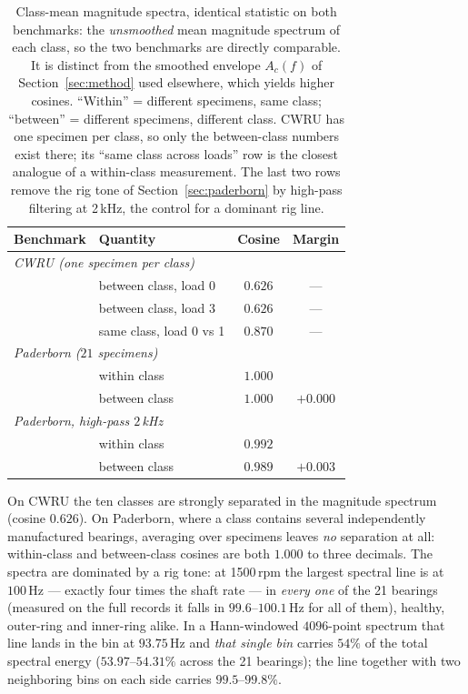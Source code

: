\documentclass[preprint,12pt]{elsarticle}
\begin{document}
\begin{table}[t]
\centering
\caption{Class-mean magnitude spectra, identical statistic on both benchmarks:
the \emph{unsmoothed} mean magnitude spectrum of each class, so the two
benchmarks are directly comparable. It is distinct from the smoothed envelope
$A_c(f)$ of Section~\ref{sec:method} used elsewhere, which yields higher
cosines.
``Within'' = different specimens, same class; ``between'' = different
specimens, different class. CWRU has one specimen per class, so only the
between-class numbers exist there; its ``same class across loads'' row is the
closest analogue of a within-class measurement. The last two rows remove the
rig tone of Section~\ref{sec:paderborn} by high-pass filtering at 2\,kHz, the
control for a dominant rig line.}
\label{tab:bench}
\small
\begin{tabular}{llcc}
\toprule
Benchmark & Quantity & Cosine & Margin \\
\midrule
\multicolumn{4}{l}{\emph{CWRU (one specimen per class)}} \\
 & between class, load 0   & $0.626$ & --- \\
 & between class, load 3   & $0.626$ & --- \\
 & same class, load 0 vs 1 & $0.870$ & --- \\
\midrule
\multicolumn{4}{l}{\emph{Paderborn ($21$ specimens)}} \\
 & within class            & $1.000$ & \\
 & between class           & $1.000$ & $+0.000$ \\
\midrule
\multicolumn{4}{l}{\emph{Paderborn, high-pass $2$\,kHz}} \\
 & within class            & $0.992$ & \\
 & between class           & $0.989$ & $+0.003$ \\
\bottomrule
\end{tabular}
\end{table}

On CWRU the ten classes are strongly separated in the magnitude spectrum
(cosine $0.626$). On Paderborn, where a class contains several independently
manufactured bearings, averaging over specimens leaves \emph{no} separation at
all: within-class and between-class cosines are both $1.000$ to three decimals.
The spectra are dominated by a rig tone: at 1500\,rpm the largest spectral line
is at $100$\,Hz --- exactly four times the shaft rate --- in \emph{every one} of
the 21 bearings (measured on the full records it falls in $99.6$--$100.1$\,Hz
for all of them), healthy, outer-ring and inner-ring alike. In a Hann-windowed
$4096$-point spectrum that line lands in the bin at $93.75$\,Hz and
\emph{that single bin} carries $54\%$ of the total spectral energy
($53.97$--$54.31\%$ across the 21 bearings); the
line together with two neighboring bins on each side carries
$99.5$--$99.8\%$.
\end{document}
